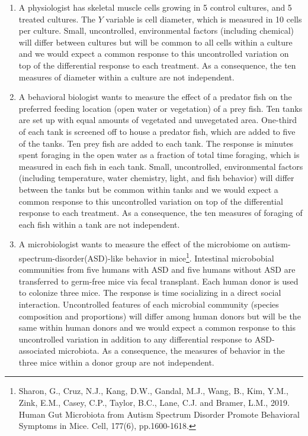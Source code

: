 \documentclass[]{book}
\let\rmarkdownfootnote\footnote%
\def\footnote{\protect\rmarkdownfootnote}
\begin{document}
\begin{enumerate}
\item
  A physiologist has skeletal muscle cells growing in 5 control cultures, and 5 treated cultures. The \(Y\) variable is cell diameter, which is measured in 10 cells per culture. Small, uncontrolled, environmental factors (including chemical) will differ between cultures but will be common to all cells within a culture and we would expect a common response to this uncontrolled variation on top of the differential response to each treatment. As a consequence, the ten measures of diameter within a culture are not independent.
\item
  A behavioral biologist wants to measure the effect of a predator fish on the preferred feeding location (open water or vegetation) of a prey fish. Ten tanks are set up with equal amounts of vegetated and unvegetated area. One-third of each tank is screened off to house a predator fish, which are added to five of the tanks. Ten prey fish are added to each tank. The response is minutes spent foraging in the open water as a fraction of total time foraging, which is measured in each fish in each tank. Small, uncontrolled, environmental factors (including temperature, water chemistry, light, and fish behavior) will differ between the tanks but be common within tanks and we would expect a common response to this uncontrolled variation on top of the differential response to each treatment. As a consequence, the ten measures of foraging of each fish within a tank are not independent.
\item
  A microbiologist wants to measure the effect of the microbiome on autism-spectrum-disorder(ASD)-like behavior in mice\footnote{Sharon, G., Cruz, N.J., Kang, D.W., Gandal, M.J., Wang, B., Kim, Y.M., Zink, E.M., Casey, C.P., Taylor, B.C., Lane, C.J. and Bramer, L.M., 2019. Human Gut Microbiota from Autism Spectrum Disorder Promote Behavioral Symptoms in Mice. Cell, 177(6), pp.1600-1618.}. Intestinal microbobial communities from five humans with ASD and five humans without ASD are transferred to germ-free mice via fecal transplant. Each human donor is used to colonize three mice. The response is time socializing in a direct social interaction. Uncontrolled features of each microbial community (species composition and proportions) will differ among human donors but will be the same within human donors and we would expect a common response to this uncontrolled variation in addition to any differential response to ASD-associated microbiota. As a consequence, the measures of behavior in the three mice within a donor group are not independent.
\end{enumerate}
\end{document}
